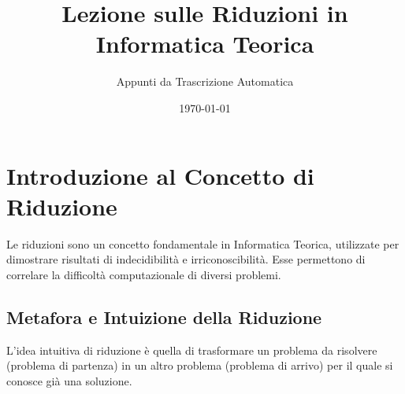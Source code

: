 \documentclass[a4paper]{article}
\title{Lezione sulle Riduzioni in Informatica Teorica}
\author{Appunti da Trascrizione Automatica}
\date{\today}
\begin{document}
\maketitle
\tableofcontents
\newpage

\section{Introduzione al Concetto di Riduzione}

Le riduzioni sono un concetto fondamentale in Informatica Teorica, utilizzate per dimostrare risultati di indecidibilità e irriconoscibilità. Esse permettono di correlare la difficoltà computazionale di diversi problemi.

\subsection{Metafora e Intuizione della Riduzione}
L'idea intuitiva di riduzione è quella di trasformare un problema da risolvere (problema di partenza) in un altro problema (problema di arrivo) per il quale si conosce già una soluzione.
\end{document}
